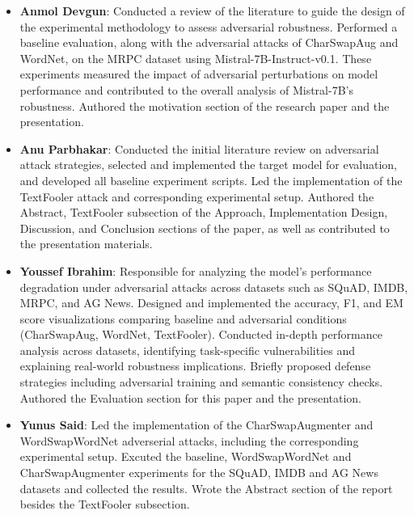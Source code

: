 \documentclass[conference]{IEEEtran}
\begin{document}
\begin{itemize}
    \item \textbf{Anmol Devgun}: Conducted a review of the literature to guide the design of the experimental methodology to assess adversarial robustness. Performed a baseline evaluation, along with the adversarial attacks of CharSwapAug and WordNet, on the MRPC dataset using Mistral-7B-Instruct-v0.1. These experiments measured the impact of adversarial perturbations on model performance and contributed to the overall analysis of Mistral-7B's robustness. Authored the motivation section of the research paper and the presentation.
    
    \item \textbf{Anu Parbhakar}: Conducted the initial literature review on adversarial attack strategies, selected and implemented the target model for evaluation, and developed all baseline experiment scripts. Led the implementation of the TextFooler attack and corresponding experimental setup. Authored the Abstract, TextFooler subsection of the Approach, Implementation Design, Discussion, and Conclusion sections of the paper, as well as contributed to the presentation materials.
 
    \item \textbf{Youssef Ibrahim}: Responsible for analyzing the model’s performance degradation under adversarial attacks across datasets such as SQuAD, IMDB, MRPC, and AG News. Designed and implemented the accuracy, F1, and EM score visualizations comparing baseline and adversarial conditions (CharSwapAug, WordNet, TextFooler). Conducted in-depth performance analysis across datasets, identifying task-specific vulnerabilities and explaining real-world robustness implications. Briefly proposed defense strategies including adversarial training and semantic consistency checks. Authored the Evaluation section for this paper and the presentation.

    \item \textbf{Yunus Said}: Led the implementation of the CharSwapAugmenter and WordSwapWordNet adverserial attacks, including the corresponding experimental setup. Excuted the baseline, WordSwapWordNet and CharSwapAugmenter experiments for the SQuAD, IMDB and AG News datasets and collected the results. Wrote the Abstract section of the report besides the TextFooler subsection.
\end{itemize}




\end{document}
